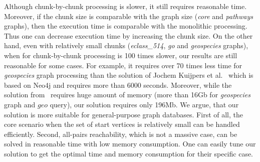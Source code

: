 Although chunk-by-chunk processing is slower, it still requires reasonable time.
Moreover, if the chunk size is comparable with the graph size (\textit{core} and \textit{pathways} graphs), then the execution time is comparable with the monolithic processing.
Thus one can decrease execution time by increasing the chunk size.
On the other hand, even with relatively small chunks (\textit{eclass\_514}, \textit{go} and \textit{geospecies} graphs), when for chunk-by-chunk processing is 100 times slower, our results are still reasonable for some cases.
For example, it requires over 70 times less time for \textit{geospecies} graph processing than the solution of Jochem Kuijpers et al.~\cite{Kuijpers:2019:ESC:3335783.3335791} which is based on Neo4j and requires more than 6000 seconds.
Moreover, while the solution from~\cite{10.1145/3398682.3399163} requires huge amount of memory (more than 16Gb for \textit{geospecies} graph and $geo$ query), our solution requires only 196Mb.
We argue, that our solution is more suitable for general-purpose graph databases.
First of all, the core scenario when the set of start vertices is relatively small can be handled efficiently.
Second, all-pairs reachability, which is not a massive case, can be solved in reasonable time with low memory consumption.
One can easily tune our solution to get the optimal time and memory consumption for their specific case.
